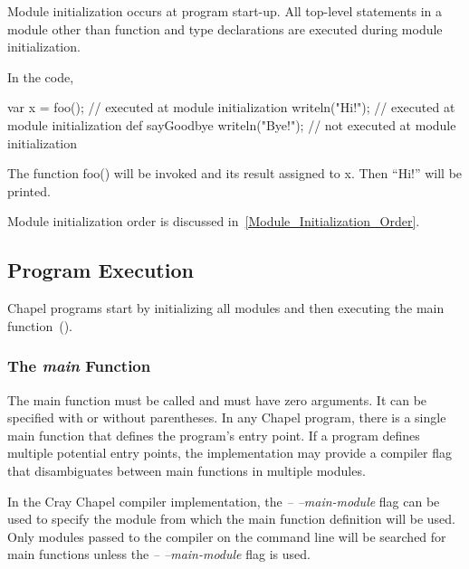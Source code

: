 Module initialization occurs at program start-up.  All top-level
statements in a module other than function and type declarations are
executed during module initialization.

\begin{example}
In the code,
\begin{chapel}
var x = foo();       // executed at module initialization
writeln("Hi!");      // executed at module initialization
def sayGoodbye {
  writeln("Bye!");   // not executed at module initialization
}
\end{chapel}
The function foo() will be invoked and its result assigned to x.  Then
``Hi!'' will be printed.
\end{example}

Module initialization order is discussed
in~\ref{Module_Initialization_Order}.



\subsection{Program Execution}
\label{Program_Execution}

Chapel programs start by initializing all modules and then executing
the main function~().

\subsubsection{The {\em main} Function}
\label{The_main_Function}

The main function must be called  and must have zero
arguments.  It can be specified with or without parentheses.  In any
Chapel program, there is a single main function that defines the
program's entry point.  If a program defines multiple potential entry
points, the implementation may provide a compiler flag that
disambiguates between main functions in multiple modules.

\begin{craychapel}
In the Cray Chapel compiler implementation, the \emph{--
--main-module} flag can be used to specify the module from which the
main function definition will be used.  Only modules passed to the
compiler on the command line will be searched for main functions
unless the \emph{-- --main-module} flag is used.
\end{craychapel}


